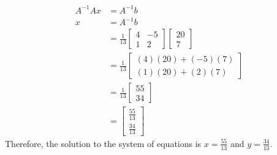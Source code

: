\documentclass[12pt]{article}
\begin{document}
\begin{align}
A^{-1}Ax &= A^{-1}b \\
x &= A^{-1}b \\
&= \frac{1}{13}
\begin{bmatrix}
4 & -5 \\
1 & 2
\end{bmatrix}
\begin{bmatrix}
20 \\
7
\end{bmatrix} \\
&= \frac{1}{13}
\begin{bmatrix}
(4)(20) + (-5)(7) \\
(1)(20) + (2)(7)
\end{bmatrix} \\
&= \frac{1}{13}
\begin{bmatrix}
55 \\
34
\end{bmatrix} \\
&=
\begin{bmatrix}
\frac{55}{13} \\
\frac{34}{13}
\end{bmatrix}
\end{align}
Therefore, the solution to the system of equations is $x = \frac{55}{13}$ and $y = \frac{34}{13}$.
\end{document}
